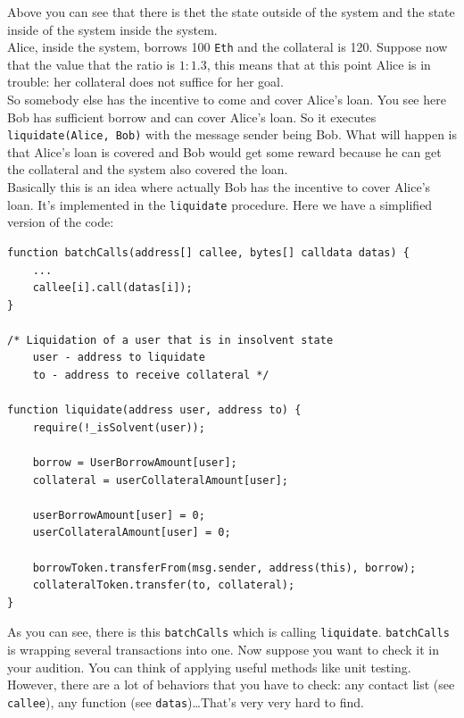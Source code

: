 \documentclass[oneside]{book}
\begin{document}
    Above you can see that there is thet the state outside of the system and the state inside of the system inside the system.\\

    Alice, inside the system, borrows 100 \texttt{Eth} and the collateral is 120.
    Suppose now that the value that the ratio is $1:1.3$, this means that at this point Alice is in trouble: her collateral does not suffice for her goal.\\

    So somebody else has the incentive to come and cover Alice's loan.
    You see here Bob has sufficient borrow and can cover Alice's loan.
    So it executes \texttt{liquidate(Alice, Bob)} with the message sender being Bob.
    What will happen is that Alice's loan is covered and Bob would get some reward because he can get the collateral and the system also covered the loan.\\

    Basically this is an idea where actually Bob has the incentive to cover Alice's loan.
    It's implemented in the \texttt{liquidate} procedure.
    Here we have a simplified version of the code:

    \begin{lstlisting}[language=Solidity, style=SolStyle]
function batchCalls(address[] callee, bytes[] calldata datas) {
    ...
    callee[i].call(datas[i]);
}

/* Liquidation of a user that is in insolvent state
    user - address to liquidate
    to - address to receive collateral */

function liquidate(address user, address to) {
    require(!_isSolvent(user));

    borrow = UserBorrowAmount[user];
    collateral = userCollateralAmount[user];

    userBorrowAmount[user] = 0;
    userCollateralAmount[user] = 0;

    borrowToken.transferFrom(msg.sender, address(this), borrow);
    collateralToken.transfer(to, collateral);
}
    \end{lstlisting}

    As you can see, there is this \texttt{batchCalls} which is calling \texttt{liquidate}.
    \texttt{batchCalls} is wrapping several transactions into one.
    Now suppose you want to check it in your audition.
    You can think of applying useful methods like unit testing.
    However, there are a lot of behaviors that you have to check: any contact list (see \texttt{callee}), any function (see \texttt{datas})\dots That's very very hard to find.\\
\end{document}
